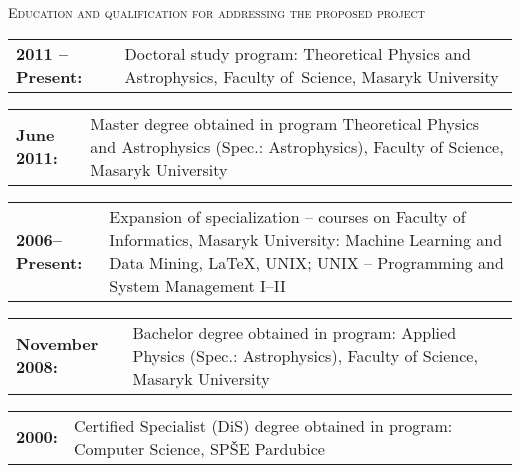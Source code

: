 \documentclass[10pt]{article}
\begin{document}
\begin{cv}
\noindent\hrulefill
\begin{cvlist}{\large \textsc{Education and qualification for addressing the proposed project}}
\item \begin{tabular}{p{2.8cm}p{11cm}} \vspace{0.2cm} {\bf{2011 --
      Present:}} & \vspace{0.2cm} Doctoral study program:
  Theoretical Physics and Astrophysics, Faculty of~Science, Masaryk
  University
 \end{tabular}
 \item \begin{tabular}{p{2.8cm}p{11cm}} {\bf{June 2011:}} & Master
   degree obtained in program Theoretical Physics and Astrophysics
   (Spec.: Astrophysics), Faculty of Science, Masaryk University
\end{tabular}
\item \begin{tabular}{p{2.8cm}p{11cm}} {\bf{2006--Present:}} &
  Expansion of specialization -- courses on Faculty of Informatics,
  Masaryk University: Machine Learning and Data Mining, \LaTeX, UNIX;
  UNIX -- Programming and System Management I--II
 \end{tabular}
  \item \begin{tabular}{p{2.8cm}p{11cm}} {\bf{November 2008:}} &
    Bachelor degree obtained in program: Applied Physics (Spec.:
    Astrophysics), Faculty of Science, Masaryk University
  \end{tabular}


  \item \begin{tabular}{p{2.8cm}p{11cm}} {\bf{2000:}} & Certified
    Specialist (DiS) degree obtained in program: Computer Science,
    SPŠE Pardubice
  \end{tabular}



\end{cvlist}
\end{cv}
\end{document}
